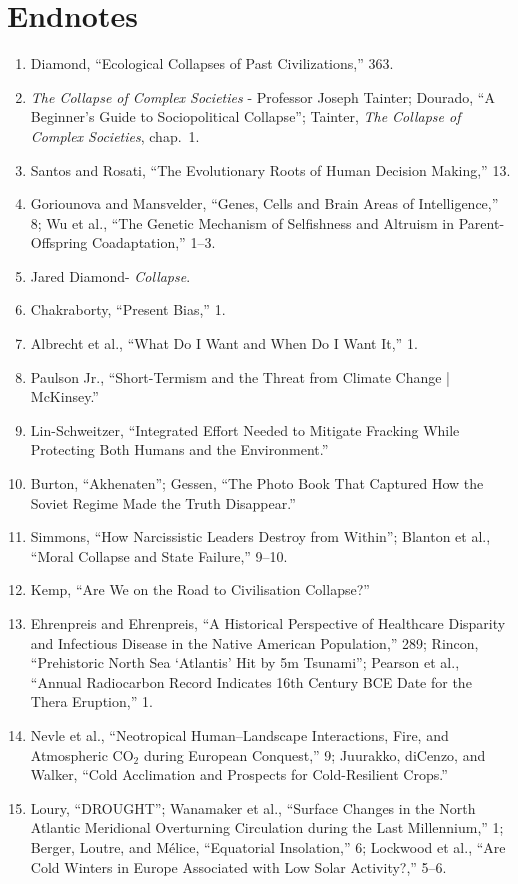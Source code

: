 \documentclass[12pt]{article}
\begin{document}
\section*{Endnotes}
\begin{enumerate}[leftmargin=*]
\item Diamond, ``Ecological Collapses of Past Civilizations,'' 363.
\item \textit{The Collapse of Complex Societies} - Professor Joseph Tainter; Dourado, ``A Beginner’s Guide to Sociopolitical Collapse''; Tainter, \textit{The Collapse of Complex Societies}, chap.\ 1.
\item Santos and Rosati, ``The Evolutionary Roots of Human Decision Making,'' 13.
\item Goriounova and Mansvelder, ``Genes, Cells and Brain Areas of Intelligence,'' 8; Wu et al., ``The Genetic Mechanism of Selfishness and Altruism in Parent-Offspring Coadaptation,'' 1--3.
\item Jared Diamond- \textit{Collapse}.
\item Chakraborty, ``Present Bias,'' 1.
\item Albrecht et al., ``What Do I Want and When Do I Want It,'' 1.
\item Paulson Jr., ``Short-Termism and the Threat from Climate Change | McKinsey.''
\item Lin-Schweitzer, ``Integrated Effort Needed to Mitigate Fracking While Protecting Both Humans and the Environment.''
\item Burton, ``Akhenaten''; Gessen, ``The Photo Book That Captured How the Soviet Regime Made the Truth Disappear.''
\item Simmons, ``How Narcissistic Leaders Destroy from Within''; Blanton et al., ``Moral Collapse and State Failure,'' 9--10.
\item Kemp, ``Are We on the Road to Civilisation Collapse?''
\item Ehrenpreis and Ehrenpreis, ``A Historical Perspective of Healthcare Disparity and Infectious Disease in the Native American Population,'' 289; Rincon, ``Prehistoric North Sea `Atlantis' Hit by 5m Tsunami''; Pearson et al., ``Annual Radiocarbon Record Indicates 16th Century BCE Date for the Thera Eruption,'' 1.
\item Nevle et al., ``Neotropical Human--Landscape Interactions, Fire, and Atmospheric CO$_2$ during European Conquest,'' 9; Juurakko, diCenzo, and Walker, ``Cold Acclimation and Prospects for Cold-Resilient Crops.''
\item Loury, ``DROUGHT''; Wanamaker et al., ``Surface Changes in the North Atlantic Meridional Overturning Circulation during the Last Millennium,'' 1; Berger, Loutre, and Mélice, ``Equatorial Insolation,'' 6; Lockwood et al., ``Are Cold Winters in Europe Associated with Low Solar Activity?,'' 5--6.

\end{enumerate}
\end{document}
